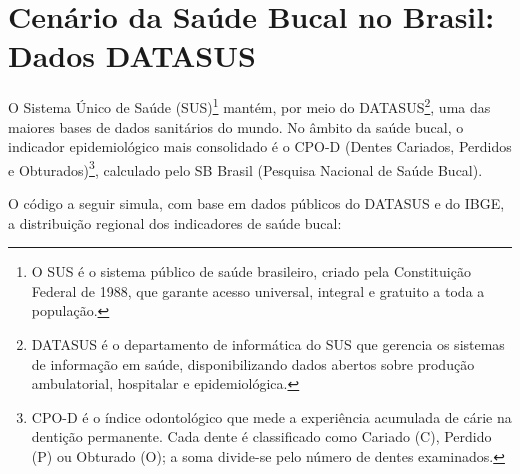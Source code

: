 \section{Cenário da Saúde Bucal no Brasil: Dados DATASUS}
\label{sec:cenario-saude-bucal}

O Sistema Único de Saúde (SUS)\footnote{O SUS é o sistema público de
saúde brasileiro, criado pela Constituição Federal de 1988, que garante
acesso universal, integral e gratuito a toda a população.} mantém, por
meio do DATASUS\footnote{DATASUS é o departamento de informática do SUS
que gerencia os sistemas de informação em saúde, disponibilizando dados
abertos sobre produção ambulatorial, hospitalar e epidemiológica.}, uma
das maiores bases de dados sanitários do mundo. No âmbito da saúde
bucal, o indicador epidemiológico mais consolidado é o CPO-D
(Dentes Cariados, Perdidos e Obturados)\footnote{CPO-D é o índice
odontológico que mede a experiência acumulada de cárie na dentição
permanente. Cada dente é classificado como Cariado (C), Perdido (P) ou
Obturado (O); a soma divide-se pelo número de dentes examinados.},
calculado pelo SB Brasil (Pesquisa Nacional de Saúde Bucal).

O código a seguir simula, com base em dados públicos do DATASUS e do
IBGE, a distribuição regional dos indicadores de saúde bucal:


